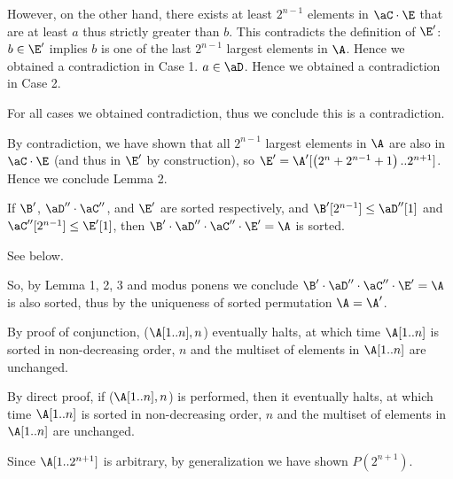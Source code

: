 \documentclass[11pt, sakura, night, 1in]{hw}
\begin{document}
{{{{\begin{proofcases}
{                        However, on the other hand, there exists at least $2^{n-1}$ elements in $\aC\cd\E$ that are at least $a$ thus strictly greater than $b$. This contradicts the definition of $\E'$: $b\in\E'$ implies $b$ is one of the last $2^{n-1}$ largest elements in $\A$.
                    }
                    Hence we obtained a contradiction in Case 1.
                    \case $a\in\aD$.
                    Hence we obtained a contradiction in Case 2.
                \end{proofcases}
                
                For all cases we obtained contradiction, thus we conclude this is a contradiction.   
            }

            By contradiction, we have shown that all $2^{n-1}$ largest elements in $\A$ are also in $\aC\cd\E$ (and thus in $\E'$ by construction), so $\E'=\A'[\bra{2^n+2^{n-1}+1}..2^{n+1}]$. Hence we conclude Lemma 2.
            
             If $\B'$, $\aD''\cd\aC''$, and $\E'$ are sorted respectively, and $\B'[2^{n-1}]\le\aD''[1]$ and $\aC''[2^{n-1}]\le\E'[1]$, then $\B'\cd\aD''\cd\aC''\cd\E'=\A$ is sorted.

             See below.
            
            So, by Lemma 1, 2, 3 and modus ponens we conclude $\B'\cd\aD''\cd\aC''\cd\E'=\A$ is also sorted, thus by the uniqueness of sorted permutation $\A=\A'$.  

            By proof of conjunction, \AUX($\A[1..n],n$) eventually halts, at which time $\A[1..n]$ is sorted in non-decreasing order, $n$ and the multiset of elements in $\A[1..n]$ are unchanged.

            By direct proof, if \AUX($\A[1..n],n$) is performed, then it eventually halts, at which time $\A[1..n]$ is sorted in non-decreasing order, $n$ and the multiset of elements in $\A[1..n]$ are unchanged.
        }
        
        Since $\A[1..2^{n+1}]$ is arbitrary, by generalization we have shown $P(2^{n+1})$.

    }
}
\end{document}
